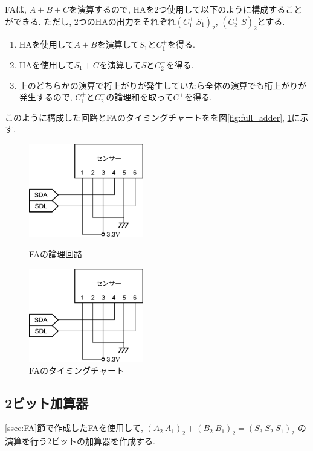 \documentclass[titlepage]{jsarticle}
\begin{document}
    FAは, $A + B + C$を演算するので, HAを2つ使用して以下のように構成することができる.
    ただし, 2つのHAの出力をそれぞれ$(C_1^+ \ S_1)_2$, $(C_2^+ \ S)_2$とする.
    \begin{enumerate}
      \item HAを使用して$A + B$を演算して$S_1$と$C_1^+$を得る.
      \item HAを使用して$S_1 + C$を演算して$S$と$C_2^+$を得る.
      \item 上のどちらかの演算で桁上がりが発生していたら全体の演算でも桁上がりが発生するので,
        $C_1^+$と$C_2^+$の論理和を取って$C^+$を得る.
    \end{enumerate}
    このように構成した回路とFAのタイミングチャートをを図\ref{fig:full_adder},
    \ref{fig:full_adder_timing}に示す.
    \begin{figure}[h]
      \begin{minipage}{0.45\hsize}
        \centering
        \includegraphics[width=5cm]{images/haisen.pdf}
        \caption{FAの論理回路}
        \label{fig:full_adder}
      \end{minipage}
      \begin{minipage}{0.45\hsize}
        \centering
        \includegraphics[width=5cm]{images/haisen.pdf}
        \caption{FAのタイミングチャート}
        \label{fig:full_adder_timing}
      \end{minipage}
    \end{figure}
  \subsection{2ビット加算器}
    \ref{ssec:FA}節で作成したFAを使用して, $(A_2 \ A_1)_2 + (B_2 \ B_1)_2 = (S_3 \ S_2 \ S_1)_2$
    の演算を行う2ビットの加算器を作成する.
\end{document}
